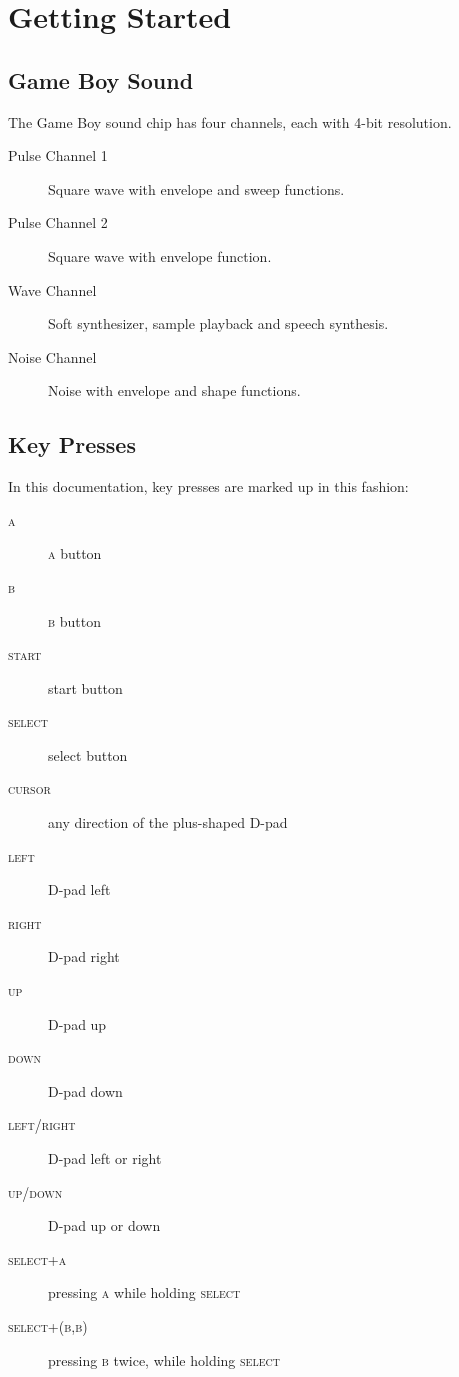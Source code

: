 \chapter{Getting Started}

\section{Game Boy Sound}
The Game Boy sound chip has four channels, each with 4-bit resolution.

\begin{description}
\item[Pulse Channel 1] Square wave with envelope and sweep functions.
\item[Pulse Channel 2] Square wave with envelope function.
\item[Wave Channel] Soft synthesizer, sample playback and speech synthesis.
\item[Noise Channel] Noise with envelope and shape functions.
\end{description}


\section{Key Presses}
In this documentation, key presses are marked up in this fashion:
\begin{description}
\item[\textsc{a}] \textsc{a} button
\item[\textsc{b}] \textsc{b} button
\item[\textsc{start}] start button
\item[\textsc{select}] select button
\item[\textsc{cursor}] any direction of the plus-shaped D-pad
\item[\textsc{left}] D-pad left
\item[\textsc{right}] D-pad right
\item[\textsc{up}] D-pad up
\item[\textsc{down}] D-pad down
\item[\textsc{left/right}] D-pad left or right
\item[\textsc{up/down}] D-pad up or down
\item[\textsc{select+a}] pressing \textsc{a} while holding \textsc{select}
\item[\textsc{select+(b,b)}] pressing \textsc{b} twice, while holding \textsc{select}
\end{description}

